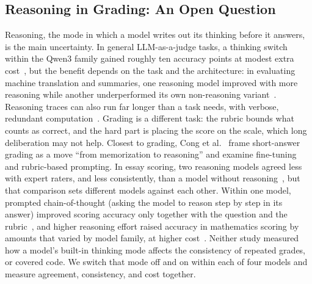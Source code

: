 \subsection{Reasoning in Grading: An Open Question}
Reasoning, the mode in which a model writes out its thinking before it answers, is the main uncertainty. In
general LLM-as-a-judge tasks, a thinking switch within the Qwen3 family gained roughly ten accuracy points at
modest extra cost~\cite{jayarao_explicit_2025}, but the benefit depends on the task and the architecture: in
evaluating machine translation and summaries, one reasoning model improved with more reasoning while another
underperformed its own non-reasoning variant~\cite{larionov_deepseek_2025}. Reasoning traces can also run far
longer than a task needs, with verbose, redundant computation~\cite{sui_stop_2025}. Grading is a different task:
the rubric bounds what counts as correct, and the hard part is placing the score on the scale, which long
deliberation may not help. Closest to grading, Cong et al.~\cite{cong_memorization_2026} frame short-answer
grading as a move ``from memorization to reasoning'' and examine fine-tuning and rubric-based prompting. In essay
scoring, two reasoning models agreed less with expert raters, and less consistently, than a model without
reasoning~\cite{yoshida_reasoning_2025}, but that comparison sets different models against each other. Within one
model, prompted chain-of-thought (asking the model to reason step by step in its answer) improved scoring accuracy
only together with the question and the rubric~\cite{lee_cot_2024}, and higher reasoning effort raised accuracy
in mathematics scoring by amounts that varied by model family, at higher cost~\cite{frohn_reasoning_2026}. Neither
study measured how a model's built-in thinking mode affects the consistency of repeated grades, or covered code.
We switch that mode off and on within each of four models and measure agreement, consistency, and cost together.

